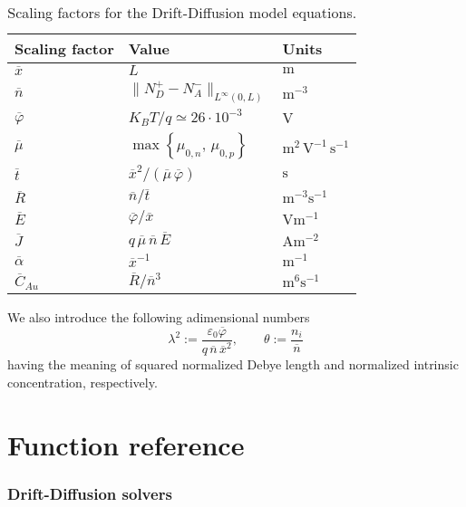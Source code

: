 \documentclass[10pt]{article}
\newcommand{\unit}[1]{\mathrm{#1}}
\newcommand{\meter}{\unit{m}}
\newcommand{\second}{\unit{s}}
\newcommand{\volt}{\unit{V}}
\newcommand{\Ampere}{\unit{A}}
\begin{document}
\begin{table}[h!]
\begin{center}
\begin{tabular}{lll}\hline
\textbf{Scaling factor}	& \textbf{Value} & \textbf{Units}\\ \hline
$\overline{x}$            & $L$            & $\meter$ \\[1mm]
$\overline{n}$            & $\| N_D^+ - N_A^-\|_{L^{\infty}(0,L)}$  
& $\meter^{-3}$ \\[1mm]
$\overline{\varphi}$      & $K_B T / q \simeq 26 \cdot 10^{-3}$ 
& $\volt$ \\[1mm]
$\overline{\mu}$          & $\max\left\{ \mu_{0,n}, \, \mu_{0,p}\right\}$ 
&  $\meter^2\,\volt^{-1}\,\second^{-1}$ \\[1mm]
$\overline{t}$          & $\overline{x}^2/(\overline{\mu} \, \overline{\varphi})$
&  $\second$ \\[1mm]
$\overline{R}$          & $\overline{n}/\overline{t}$
&  $\meter^{-3} \second^{-1}$ \\[1mm]
$\overline{E}$          & $\overline{\varphi}/\overline{x}$
&  $\volt \meter^{-1}$  \\[1mm]
$\overline{J}$          & $q \, \overline{\mu} \, \overline{n} \, 
\overline{E}$ &  $\Ampere \meter^{-2}$  \\[1mm]
$\overline{\alpha}$ & $\overline{x}^{-1}$ & $\meter^{-1}$ \\[1mm]
$\overline{C}_{Au}$ & $\overline{R}/\overline{n}^3$ & 
$\meter^{6} \second^{-1}$ \\[1mm]
\hline
\end{tabular}
\caption{Scaling factors for the Drift-Diffusion model equations.}
\label{tab:model_param_1d}
\end{center}
\end{table}

We also introduce the following adimensional numbers
$$
\lambda^2:= \displaystyle \frac{\varepsilon_0 \overline{\varphi}}
{q \, \overline{n} \, \overline{x}^2}, \qquad
\theta:= \displaystyle \frac{n_i}{\overline{n}}
$$
having the meaning of squared normalized Debye length and
normalized intrinsic concentration, respectively.

\part{Function reference}

\section{Drift-Diffusion solvers}
\end{document}
